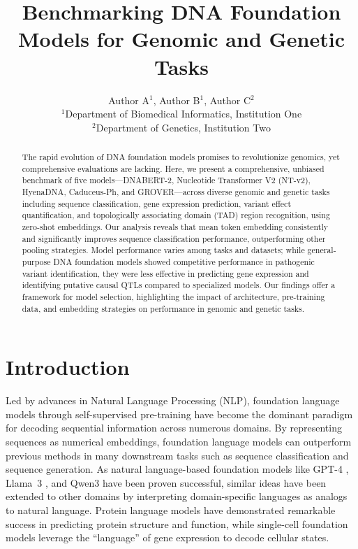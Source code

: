 \documentclass{article}
\title{Benchmarking DNA Foundation Models for Genomic and Genetic Tasks}
\author{
Author A$^{1}$, Author B$^{1}$, Author C$^{2}$ \\
$^{1}$Department of Biomedical Informatics, Institution One \\
$^{2}$Department of Genetics, Institution Two
}
\date{}
\begin{document}
\maketitle

\begin{abstract}
The rapid evolution of DNA foundation models promises to revolutionize genomics, yet comprehensive evaluations are lacking. Here, we present a comprehensive, unbiased benchmark of five models---DNABERT-2, Nucleotide Transformer V2 (NT-v2), HyenaDNA, Caduceus-Ph, and GROVER---across diverse genomic and genetic tasks including sequence classification, gene expression prediction, variant effect quantification, and topologically associating domain (TAD) region recognition, using zero-shot embeddings. Our analysis reveals that mean token embedding consistently and significantly improves sequence classification performance, outperforming other pooling strategies. Model performance varies among tasks and datasets; while general-purpose DNA foundation models showed competitive performance in pathogenic variant identification, they were less effective in predicting gene expression and identifying putative causal QTLs compared to specialized models. Our findings offer a framework for model selection, highlighting the impact of architecture, pre-training data, and embedding strategies on performance in genomic and genetic tasks.
\end{abstract}

\section{Introduction}

Led by advances in Natural Language Processing (NLP), foundation language models through self-supervised pre-training have become the dominant paradigm for decoding sequential information across numerous domains. By representing sequences as numerical embeddings, foundation language models can outperform previous methods in many downstream tasks such as sequence classification and sequence generation. As natural language-based foundation models like GPT-4 \citep{openai2023gpt4}, Llama~3 \citep{touvron2024llama3}, and Qwen3 \citep{qwen2024qwen3} have been proven successful, similar ideas have been extended to other domains by interpreting domain-specific languages as analogs to natural language. Protein language models \citep{madani2023large, lin2022protein, cui2024scgpt} have demonstrated remarkable success in predicting protein structure and function, while single-cell foundation models leverage the ``language'' of gene expression to decode cellular states.
\end{document}

